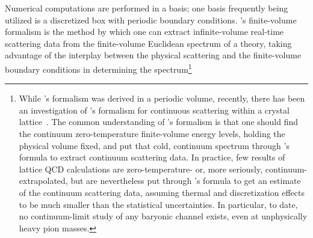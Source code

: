 Numerical computations are performed in a basis; one basis frequently being utilized is a discretized box with periodic boundary conditions.
\Luscher's finite-volume formalism\cite{Hamber198399,luscher:1986I,luscher:1986II,wiese1989,Luscher1991,Luscher1991237} is the method by which one can extract infinite-volume real-time scattering data from the finite-volume Euclidean spectrum of a theory, taking advantage of the interplay between the physical scattering and the finite-volume boundary conditions in determining the spectrum\footnote{While \Luscher's formalism was derived in a periodic volume, recently, there has been an investigation of \Luscher's formalism for continuous scattering within a crystal lattice~\cite{Valiente:2015oya}.
The common understanding of \Luscher's formalism is that one should find the continuum zero-temperature finite-volume energy levels, holding the physical volume fixed, and put that cold, continuum spectrum through \Luscher's formula to extract continuum scattering data.
In practice, few results of lattice QCD calculations are zero-temperature- or, more seriously, continuum-extrapolated, but are nevertheless put through \Luscher's formula to get an estimate of the continuum scattering data, assuming thermal and discretization effects to be much smaller than the statistical uncertainties.
In particular, to date, no continuum-limit study of any baryonic channel exists, even at unphysically heavy pion masses.

}
